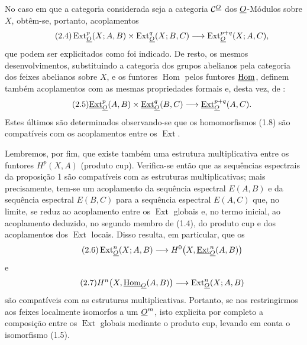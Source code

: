 No caso em que a categoria considerada seja a categoria $\mathcal C^{\underline{O}}$ dos
$\underline{O}$-Módulos sobre $X$, obtêm-se, portanto, acoplamentos
\begin{equation}\tag{2.4}
  \operatorname{Ext}_{\underline{O}}^{p}(X;A,B)
  \times\operatorname{Ext}_{\underline{O}}^{q}(X;B,C)
  \longrightarrow\operatorname{Ext}_{\underline{O}}^{p+q}(X;A,C),
\end{equation}
que podem ser explicitados como foi indicado. De resto, os mesmos
desenvolvimentos, substituindo a categoria dos grupos abelianos pela
categoria dos feixes abelianos sobre $X$, e os funtores $\operatorname{Hom}$
pelos funtores $\underline{\operatorname{Hom}}$, definem também acoplamentos com as mesmas
propriedades formais e, desta vez, de :
\begin{equation}\tag{2.5}
  \underline{\operatorname{Ext}}_{\underline{O}}^{p}(A,B)\times\underline{\operatorname{Ext}}_{\underline{O}}^{q}(B,C)
  \longrightarrow\underline{\operatorname{Ext}}_{\underline{O}}^{p+q}(A,C).
\end{equation}
Estes últimos são determinados observando-se que os homomorfismos (1.8) são
compatíveis com os acoplamentos entre os $\operatorname{Ext}$.

Lembremos, por fim, que existe também uma estrutura multiplicativa entre os funtores
$H^{p}(X,A)$ (produto cup). Verifica-se então que as sequências espectrais da
proposição 1 são compatíveis com as estruturas multiplicativas; mais
precisamente, tem-se um acoplamento da sequência espectral $E(A,B)$ e da sequência
espectral $E(B,C)$ para a sequência espectral $E(A,C)$ que, no limite,
se reduz ao acoplamento entre os $\operatorname{Ext}$ globais e, no
termo inicial, ao acoplamento deduzido, no segundo membro de (1.4), do
produto cup e dos acoplamentos dos $\operatorname{Ext}$ locais. Disso resulta,
em particular, que os 
\begin{equation}\tag{2.6}
  \operatorname{Ext}_{\underline{O}}^{n}(X;A,B)
  \longrightarrow H^{0}\bigl(X,\underline{\operatorname{Ext}}_{\underline{O}}^{n}(A,B)\bigr)
\end{equation}
e
\begin{equation}\tag{2.7}
  H^{n}\bigl(X,\underline{\operatorname{Hom}}_{\underline{O}}(A,B)\bigr)
  \longrightarrow\operatorname{Ext}_{\underline{O}}^{n}(X;A,B)
\end{equation}
são compatíveis com as estruturas multiplicativas. Portanto, se nos restringirmos aos
feixes localmente isomorfos a um $\underline{O}^{m}$, isto explicita por completo a
composição entre os $\operatorname{Ext}$ globais mediante o produto cup, levando
em conta o isomorfismo (1.5).



